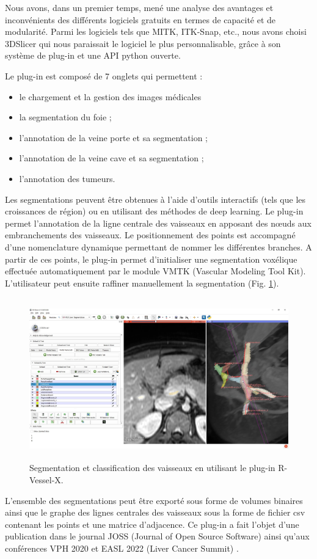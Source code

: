 Nous avons, dans un premier temps, mené une analyse des avantages et inconvénients des différents logiciels gratuits en termes de capacité et de modularité. Parmi les logiciels tels que MITK, ITK-Snap, etc., nous avons choisi 3DSlicer qui nous paraissait le logiciel le plus personnalisable, grâce à son système de plug-in et une API python ouverte.

Le plug-in est composé de 7 onglets qui permettent :
\begin{itemize}
    \item le chargement et la gestion des images médicales
    \item la segmentation du foie ;
    \item l'annotation de la veine porte et sa segmentation ;
    \item l'annotation de la veine cave et sa segmentation ;
    \item l'annotation des tumeurs.
\end{itemize}

Les segmentations peuvent être obtenues à l'aide d'outils interactifs (tels que les croissances de région) ou en utilisant des méthodes de deep learning. 
Le plug-in permet l'annotation de la ligne centrale des vaisseaux en apposant des nœuds aux embranchements des vaisseaux. Le positionnement des points est accompagné d'une nomenclature dynamique permettant de nommer les différentes branches. A partir de ces points, le plug-in permet d'initialiser une segmentation voxélique effectuée automatiquement par le module VMTK (Vascular Modeling Tool Kit). L'utilisateur peut ensuite raffiner manuellement la segmentation (Fig. \ref{fig:slicer_plug_in}).
\begin{figure}[!ht]
    \includegraphics[height=7cm]{Images/plug_in_segmentation.png}
    \caption{Segmentation et classification des vaisseaux en utilisant le plug-in R-Vessel-X.}
    \label{fig:slicer_plug_in}
\end{figure}

L'ensemble des segmentations peut être exporté sous forme de volumes binaires ainsi que le graphe des lignes centrales des vaisseaux sous la forme de fichier csv contenant les points et une matrice d'adjacence.
Ce plug-in a fait l'objet d'une publication dans le journal JOSS (Journal of Open Source Software) \cite{Lamy2022_JOSS} ainsi qu'aux conférences VPH 2020 \cite{Lamy2020_VPH_plugin} et EASL 2022 (Liver Cancer Summit) \cite{Lamy2022_EASL}.





